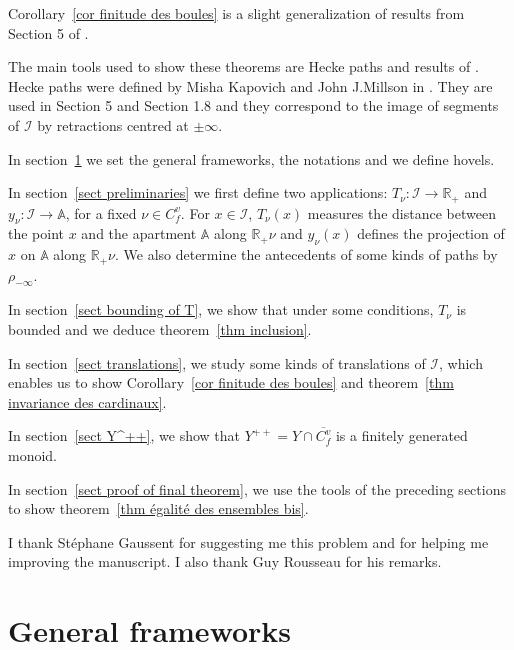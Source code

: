 \documentclass[12pt]{article}
\theoremstyle{plain}
\theoremstyle{definition}
\newcommand{\R}{\mathbb{R}}
\newcommand{\A}{\mathbb{A}}
\newcommand{\I}{\mathcal{I}}
\begin{document}
Corollary~\ref{cor finitude des boules} is a slight generalization of results from Section 5 of \cite{gaussent2014spherical}.


\vspace{3mm}


The main tools used to show these theorems are Hecke paths and results of \cite{gaussent2014spherical}. Hecke paths were defined by Misha Kapovich and John J.Millson in \cite{MR2415306}. They are used in \cite{gaussent2008kac} Section 5 and \cite{gaussent2014spherical} Section 1.8 and they correspond to the image of segments of $\mathcal{I}$ by retractions centred at $\pm\infty$.

In section~\ref{sect general frameworks} we set the general frameworks, the notations and we define hovels.

 In section~\ref{sect preliminaries} we first define two applications: $T_\nu:\I\rightarrow\R_+$ and $y_\nu:\I\rightarrow \A$, for a fixed $\nu\in C_f^v$. For $x\in\I$, $T_\nu(x)$ measures the distance between the point $x$ and the apartment $\A$ along $\R_+\nu$ and $y_\nu(x)$ defines the projection of $x$ on $\A$ along $\R_+\nu$. We also determine the antecedents of some kinds of paths by $\rho_{-\infty}$. 
 
 In section~\ref{sect bounding of T}, we show that under some conditions, $T_\nu$ is bounded and we deduce theorem~\ref{thm inclusion}. 
 
 In section~\ref{sect translations}, we study some kinds of translations of $\I$, which enables us to show Corollary~\ref{cor finitude des boules} and theorem~\ref{thm invariance des cardinaux}.
 
 In section~\ref{sect Y^++}, we show that $Y^{++}=Y\cap \overline{C_f^v}$ is a finitely generated monoid.
 
 In section~\ref{sect proof of final theorem}, we use the tools of the preceding sections to show theorem~\ref{thm égalité des ensembles bis}. 

\vspace{3mm}

I thank Stéphane Gaussent for suggesting me this problem and for helping me improving the manuscript. I also thank Guy Rousseau for his remarks.


\section{General frameworks}\label{sect general frameworks}
\end{document}
